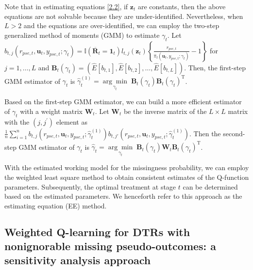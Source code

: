 \documentclass[12pt]{article}
\begin{document}
Note that in estimating equations \eqref{2.2}, if $\bm{z}_t$ are constants, then the above equations are not solvable because they are under-identified. Nevertheless, when $L > 2$ and the equations are over-identified, we can employ the two-step generalized method of moments (GMM) to estimate $\gamma_t$. Let $b_{t,j}(r_{pse,t}, \bm{u}_t, y_{pse,t};\gamma_t) = \mathbb{I} (\overline{\bm{R}}_t=\bm{1}_t) l_{t,j}(\bm{z}_t)\left\{\frac{r_{pse,t}}{\widehat{\pi}_t(\bm{u}_t,y_{pse,t}; \gamma_t)} -1 \right\}$ for $j=1,\ldots,L$ and $\bm{B}_t(\gamma_t) = (\widehat{E}[b_{t,1}],\widehat{E}[b_{t,2}],\ldots,\widehat{E}[b_{t,L}] )$. Then, the first-step GMM estimator of $\gamma_t$ is $\widehat{\gamma}^{(1)}_t=\underset{\gamma_t}{\arg\min } \; \bm{B}_t(\gamma_t) \bm{B}_t(\gamma_t)^{\mathrm{T}}$.


Based on the first-step GMM estimator, we can build a more efficient estimator of $\gamma_t$ with a weight matrix $\bm{W}_t$. Let $\bm{W}_{t}$ be the inverse matrix of the $L \times L$ matrix with the $\left(j, j^{\prime}\right)$ element as $\frac{1}{n} \sum_{i=1}^{n} b_{t,j}(r_{pse,t}, \bm{u}_t, y_{pse,t};\widehat{\gamma}^{(1)}_t) b_{t,j'}(r_{pse,t}, \bm{u}_t, y_{pse,t};\widehat{\gamma}^{(1)}_t)$.
Then the second-step GMM estimator of $\gamma_t$ is $\widehat{\gamma}_t = \underset{\gamma_t}{\arg\min }  \; \bm{B}_t(\gamma_t) \bm{W}_{t} \bm{B}_t(\gamma_t)^{\mathrm{T}}$.

With the estimated working model for the missingness probability, we can employ the weighted least square method to obtain consistent estimates of the Q-function parameters. Subsequently, the optimal treatment at stage $t$ can be determined based on the estimated parameters. We henceforth refer to this approach as the estimating equation (EE) method.


\subsection{Weighted Q-learning for DTRs with nonignorable missing pseudo-outcomes: a sensitivity analysis approach}
\end{document}
